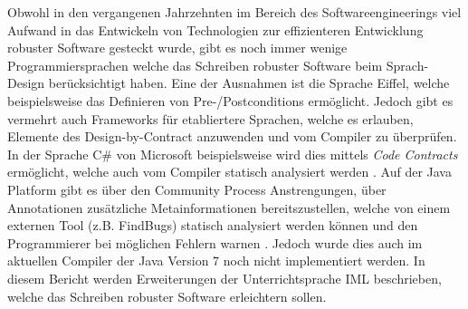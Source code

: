 Obwohl in den vergangenen Jahrzehnten im Bereich des Softwareengineerings viel 
Aufwand in das Entwickeln von Technologien zur effizienteren Entwicklung robuster
Software gesteckt wurde, gibt es noch immer wenige Programmiersprachen welche 
das Schreiben robuster Software beim Sprach-Design berücksichtigt haben. Eine der Ausnahmen 
ist die Sprache Eiffel, welche beispielsweise das Definieren von Pre-/Postconditions
ermöglicht. Jedoch gibt es vermehrt auch Frameworks für etabliertere Sprachen, welche 
es erlauben, Elemente des Design-by-Contract anzuwenden und vom Compiler zu überprüfen.
In der Sprache C\# von Microsoft beispielsweise wird dies mittels \textit{Code Contracts}
 ermöglicht, welche auch vom Compiler statisch analysiert werden \cite{MS:CodeContracts}.
Auf der Java Platform gibt es über den Community Process Anstrengungen, über Annotationen
zusätzliche Metainformationen bereitszustellen, welche von einem externen Tool (z.B. FindBugs) statisch analysiert 
werden können und den Programmierer bei möglichen Fehlern warnen \cite{JSR:305}. Jedoch wurde dies
auch im aktuellen Compiler der Java Version 7 noch nicht implementiert werden. In diesem Bericht werden Erweiterungen
der Unterrichtsprache IML beschrieben, welche das Schreiben robuster Software erleichtern sollen.

